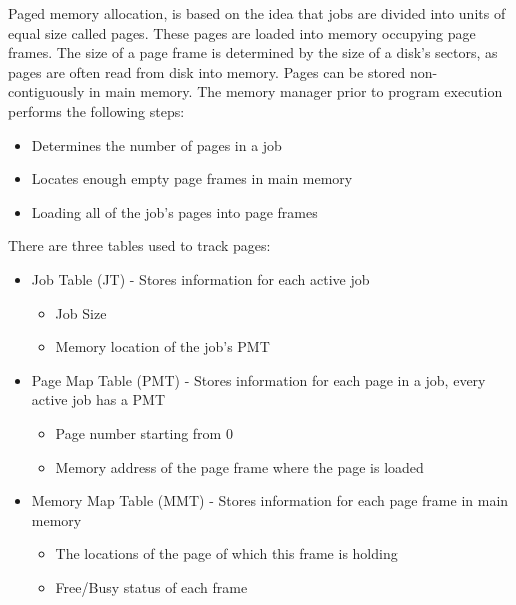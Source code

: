 \documentclass[12pt letter]{report}
\begin{document}




Paged memory allocation, is based on the idea that jobs are divided into units of equal size called pages. These pages are loaded into memory occupying page frames. The size of a page frame is determined by the size of a disk's sectors, as pages are often read from disk into memory. Pages can be stored non-contiguously in main memory. The memory manager prior to program execution performs the following steps:
\begin{itemize}
  \item Determines the number of pages in a job
  \item Locates enough empty page frames in main memory
  \item Loading all of the job's pages into page frames
\end{itemize}


There are three tables used to track pages:
\begin{itemize}
  \item Job Table (JT) - Stores information for each active job
        \begin{itemize}
          \item Job Size
          \item Memory location of the job's PMT
        \end{itemize}
  \item Page Map Table (PMT) - Stores information for each page in a job, every active job has a PMT
        \begin{itemize}
          \item Page number starting from 0
          \item Memory address of the page frame where the page is loaded
        \end{itemize}
  \item  Memory Map Table (MMT) - Stores information for each page frame in main memory
        \begin{itemize}
          \item The locations of the page of which this frame is holding
          \item  Free/Busy status of each frame
        \end{itemize}
\end{itemize}
\end{document}
